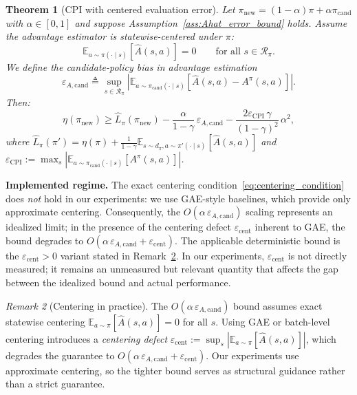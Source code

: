 \documentclass{article}
\theoremstyle{plain}
\newtheorem{theorem}{Theorem}[section]
\theoremstyle{definition}
\theoremstyle{remark}
\newtheorem{remark}[theorem]{Remark}
\newcommand{\longonly}[1]{}
\newcommand{\longonly}[1]{#1}
\newcommand{\E}{\mathbb{E}}
\begin{document}
\begin{theorem}[CPI with centered evaluation error]
\label{thm:monotone_with_error}
Let $\pi_{\mathrm{new}}=(1-\alpha)\pi+\alpha\pi_{\mathrm{cand}}$ with $\alpha\in[0,1]$ and suppose Assumption~\ref{ass:Ahat_error_bound} holds.
Assume the advantage estimator is \emph{statewise-centered under $\pi$}:
\begin{equation}
\E_{a\sim\pi(\cdot\mid s)}[\widehat A(s,a)] = 0
\qquad\text{for all } s\in\mathcal{R}_\pi.
\label{eq:centering_condition}
\end{equation}
We define the candidate-policy bias in advantage estimation
\begin{equation}
\varepsilon_{A,\mathrm{cand}}
\triangleq
\sup_{s \in \mathcal{R}_{\pi}}
\left|
\E_{a\sim\pi_{\mathrm{cand}}(\cdot\mid s)}\!\left[\widehat{A}(s,a)-A^\pi(s,a)\right]
\right|.
\label{eq:epsA0_def}
\end{equation}
Then:
\begin{equation}
\eta(\pi_{\mathrm{new}})
\ge
\widehat{L}_\pi(\pi_{\mathrm{new}})
-
\frac{\alpha}{1-\gamma}\,\varepsilon_{A,\mathrm{cand}}
-
\frac{2\varepsilon_{\mathrm{CPI}}\,\gamma}{(1-\gamma)^2}\,\alpha^2,
\label{eq:main_theorem}
\end{equation}
where $\widehat{L}_\pi(\pi') = \eta(\pi) + \frac{1}{1-\gamma}\E_{s\sim d_\pi, a\sim\pi'(\cdot\mid s)}[\widehat{A}(s,a)]$ and $\varepsilon_{\mathrm{CPI}}:=\max_s\left|\E_{a\sim\pi_{\mathrm{cand}}(\cdot\mid s)}[A^\pi(s,a)]\right|$.
\end{theorem}

\noindent\textbf{Implemented regime.}
The exact centering condition~\eqref{eq:centering_condition} does \emph{not} hold in our experiments: we use GAE-style baselines, which provide only approximate centering.
Consequently, the $O(\alpha\,\varepsilon_{A,\mathrm{cand}})$ scaling represents an idealized limit; in the presence of the centering defect $\varepsilon_{\mathrm{cent}}$ inherent to GAE, the bound degrades to $O(\alpha\,\varepsilon_{A,\mathrm{cand}} + \varepsilon_{\mathrm{cent}})$.
The applicable deterministic bound is the $\varepsilon_{\mathrm{cent}}>0$ variant stated in Remark~\ref{rem:centering_practice}\longonly{ and Remark~\ref{rem:approx_centering}}.
In our experiments, $\varepsilon_{\mathrm{cent}}$ is not directly measured; it remains an unmeasured but relevant quantity that affects the gap between the idealized bound and actual performance.

\begin{remark}[Centering in practice]
\label{rem:centering_practice}
The $O(\alpha\,\varepsilon_{A,\mathrm{cand}})$ bound assumes exact statewise centering $\E_{a\sim\pi}[\widehat{A}(s,a)] = 0$ for all $s$. Using GAE or batch-level centering introduces a \emph{centering defect} $\varepsilon_{\mathrm{cent}} := \sup_s |\E_{a\sim\pi}[\widehat{A}(s,a)]|$, which degrades the guarantee to $O(\alpha\,\varepsilon_{A,\mathrm{cand}} + \varepsilon_{\mathrm{cent}})$. Our experiments use approximate centering, so the tighter bound serves as structural guidance rather than a strict guarantee.
\end{remark}
\end{document}
